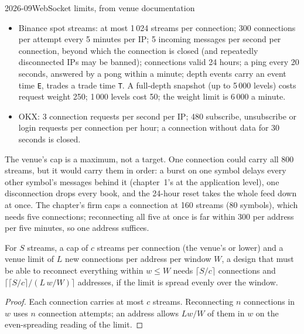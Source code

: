 \begin{dated}{2026-09}{WebSocket limits, from venue documentation}\label{dat:nw:api-engineering-for-crypto-venues:limits}
\begin{itemize}
\item Binance spot streams: at most 1\,024 streams per connection; 300 connections per attempt every 5 minutes per IP; 5 incoming messages per
  second per connection, beyond which the connection is closed (and repeatedly disconnected IPs may be banned); connections valid 24 hours; a ping
  every 20 seconds, answered by a pong within a minute; depth events carry an event time \texttt{E}, trades a trade time \texttt{T}. A full-depth
  snapshot (up to 5\,000 levels) costs request weight 250; 1\,000 levels cost 50; the weight limit is 6\,000 a minute.
\item OKX: 3 connection requests per second per IP; 480 subscribe, unsubscribe or login requests per connection per hour; a connection without data
  for 30 seconds is closed.
\end{itemize}
\end{dated}

The venue's cap is a maximum, not a target. One connection could carry all 800 streams, but it would carry them in order: a burst on one symbol
delays every other symbol's messages behind it (chapter~1's  at the application level), one disconnection drops every book,
and the 24-hour reset takes the whole feed down at once. The chapter's firm caps a connection at 160 streams (80 symbols), which needs five
connections; reconnecting all five at once is far within 300 per address per five minutes, so one address suffices.

\begin{proposition}\label{prop:nw:api-engineering-for-crypto-venues:shards}
For $S$ streams, a cap of $c$ streams per connection (the venue's or lower) and a venue limit of $L$ new connections per address per window $W$,
a design that must be able to reconnect everything within $w \le W$ needs $\lceil S/c \rceil$ connections and $\lceil \lceil S/c \rceil / (L\,w/W)
\rceil$ addresses, if the limit is spread evenly over the window.
\end{proposition}

\begin{proof}
Each connection carries at most $c$ streams. Reconnecting $n$ connections in $w$ uses $n$ connection attempts; an address allows $L w/W$ of them in
$w$ on the even-spreading reading of the limit.
\end{proof}

